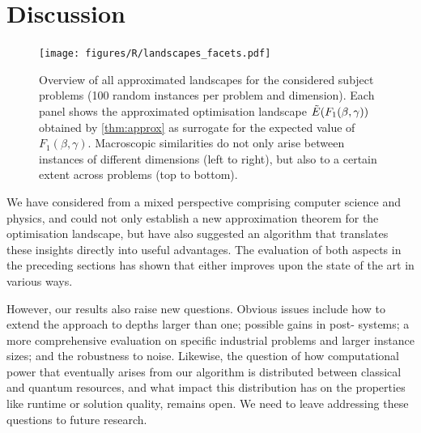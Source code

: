 \section{Discussion}
\label{sec:discussion}
\begin{figure}[htbp]
    \centering
    \texttt{[image: figures/R/landscapes\_facets.pdf]}
    \caption{Overview of all approximated landscapes for the considered subject problems (100 random instances per problem and dimension). Each panel shows the 
    approximated optimisation landscape 
    \(\tilde{E}(F_{1}(\beta, \gamma))\) obtained by \cref{thm:approx} as surrogate for the expected value of \(F_{1}(\beta, \gamma)\). Macroscopic similarities do not only arise between instances of different dimensions (left to right), but also to a certain extent across problems (top to bottom).}
    \label{fig:landscapes}
\end{figure}
%
We have considered \QAOA from a mixed perspective comprising computer science and physics, and could not only establish a new 
approximation theorem for the optimisation landscape, but have also 
suggested an algorithm that translates these insights directly into useful advantages. The evaluation of both aspects in the preceding 
sections has shown that either improves upon the state of the art
in various ways.

However, our results also raise new questions.
Obvious issues include how to extend the approach
to \QAOA depths larger than one;  possible gains in post-\NISQ
systems; a more comprehensive evaluation on specific
industrial problems and larger instance sizes; and the
robustness to noise. Likewise, the question of how computational 
power that eventually arises from our algorithm is distributed 
between classical and quantum resources, and what impact this 
distribution has on the properties like runtime or solution 
quality, remains open. We need to leave addressing these
questions to future research.

